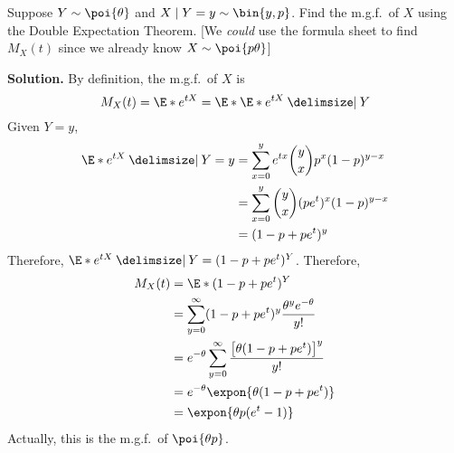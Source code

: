 \begin{Example}{}{}
    Suppose $ Y \sim \poi{\theta} $ and $ X\mid Y=y \sim \bin{y,p} $.
    Find the m.g.f.\ of $ X $ using the Double Expectation Theorem.
        [We \emph{could} use the formula sheet to find $ M_X(t) $
            since we already know $ X \sim \poi{p\theta} $]

    \textbf{Solution.} By definition, the m.g.f.\ of $ X $ is
    \[ M_X(t)=\E*{e^{tX}}=\E*{\E*{e^{tX}\given Y}} \]
    Given $ Y=y $,
    \begin{align*}
        \E*{e^{tX}\given Y=y}
         & =\sum_{x=0}^{y} e^{tx}\binom{y}{x}p^x(1-p)^{y-x} \\
         & =\sum_{x=0}^{y}\binom{y}{x}(pe^t)^x(1-p)^{y-x}   \\
         & =(1-p+pe^t)^y
    \end{align*}
    Therefore, $ \E*{e^{tX}\given Y}=(1-p+pe^t)^Y $. Therefore,
    \begin{align*}
        M_X(t)
         & =\E*{(1-p+pe^t)^Y}                                                          \\
         & =\sum_{y=0}^{\infty} (1-p+pe^t)^y \frac{\theta^y e^{-\theta}}{y!}           \\
         & =e^{-\theta}\sum_{y=0}^{\infty} \frac{\bigl[ \theta(1-p+pe^t) \bigr]^y}{y!} \\
         & =e^{-\theta}\expon{\theta(1-p+pe^t)}                                        \\
         & =\expon{\theta p(e^t-1)}
    \end{align*}
    Actually, this is the m.g.f.\ of $ \poi{\theta p} $.
\end{Example}


